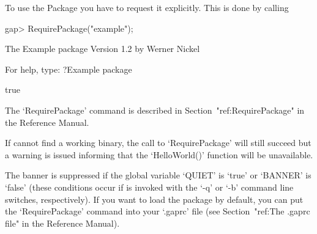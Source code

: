 To use the {\Example} Package you have to request it explicitly. This  is
done by calling

\beginexample
gap> RequirePackage("example");

           The Example package
               Version 1.2    
            by Werner Nickel 

     For help, type: ?Example package

true
\endexample

The `RequirePackage' command is described in Section~"ref:RequirePackage"
in the {\GAP} Reference Manual.

If {\GAP} cannot find a working binary, the call to `RequirePackage' will
still succeed but a warning is issued informing that  the  `HelloWorld()'
function will be unavailable.

The banner is suppressed if the global {\GAP} variable `QUIET' is  `true'
or `BANNER' is `false' (these conditions occur if {\GAP} is invoked  with
the `-q' or `-b' command line switches, respectively).  If  you  want  to
load the {\Example} package by default, you can put the  `RequirePackage'
command into your `.gaprc' file (see Section~"ref:The .gaprc file" in the
{\GAP} Reference Manual).

